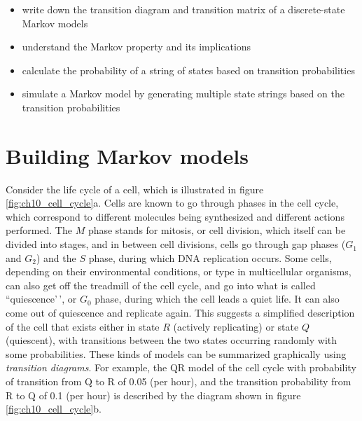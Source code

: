 \documentclass[
  letterpaper,
  DIV=11,
  numbers=noendperiod]{scrreprt}
\providecommand{\tightlist}{%
  \setlength{\itemsep}{0pt}\setlength{\parskip}{0pt}}\usepackage{longtable,booktabs,array}
\begin{document}
\begin{itemize}
\tightlist
\item
  write down the transition diagram and transition matrix of a
  discrete-state Markov models
\item
  understand the Markov property and its implications
\item
  calculate the probability of a string of states based on transition
  probabilities
\item
  simulate a Markov model by generating multiple state strings based on
  the transition probabilities
\end{itemize}

\hypertarget{building-markov-models}{%
\section{Building Markov models}\label{building-markov-models}}

\label{sec:model10}

Consider the life cycle of a cell, which is illustrated in figure
\ref{fig:ch10_cell_cycle}a. Cells are known to go through phases in the
cell cycle, which correspond to different molecules being synthesized
and different actions performed. The \(M\) phase stands for mitosis, or
cell division, which itself can be divided into stages, and in between
cell divisions, cells go through gap phases (\(G_1\) and \(G_2\)) and
the \(S\) phase, during which DNA replication occurs. Some cells,
depending on their environmental conditions, or type in multicellular
organisms, can also get off the treadmill of the cell cycle, and go into
what is called ``quiescence'\,', or \(G_0\) phase, during which the cell
leads a quiet life. It can also come out of quiescence and replicate
again. This suggests a simplified description of the cell that exists
either in state \(R\) (actively replicating) or state \(Q\) (quiescent),
with transitions between the two states occurring randomly with some
probabilities. These kinds of models can be summarized graphically using
\emph{transition diagrams}. For example, the QR model of the cell cycle
with probability of transition from Q to R of 0.05 (per hour), and the
transition probability from R to Q of 0.1 (per hour) is described by the
diagram shown in figure \ref{fig:ch10_cell_cycle}b.
\end{document}
